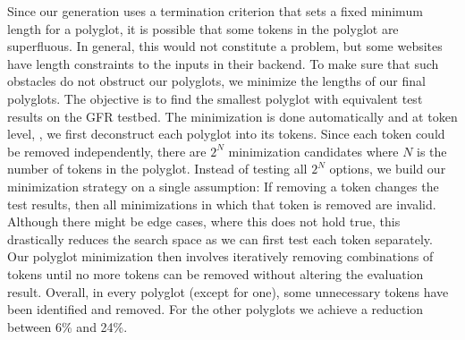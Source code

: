 Since our generation uses a termination criterion that sets a fixed minimum length for a polyglot, it is possible that some tokens in the polyglot are superfluous.
In general, this would not constitute a problem, but some websites have length constraints to the inputs in their backend. %
To make sure that such obstacles do not obstruct our polyglots, we minimize the lengths of our final polyglots.
The objective is to find the smallest polyglot with equivalent test results on the GFR testbed\@.
The minimization is done automatically and at token level, \ie, we first deconstruct each polyglot into its tokens.
Since each token could be removed independently, there are $2^N$ minimization candidates where $N$ is the number of tokens in the polyglot.
Instead of testing all $2^N$ options, we build our minimization strategy on a single assumption:
If removing a token changes the test results, then all minimizations in which that token is removed are invalid.
Although there might be edge cases, where this does not hold true, this drastically reduces the search space as we can first test each token separately.
Our polyglot minimization then involves iteratively removing combinations of tokens until no more tokens can be removed without altering the evaluation result.
Overall, in every polyglot (except for one), some unnecessary tokens have been identified and removed.
For the other polyglots we achieve a reduction between 6\% and 24\%.
